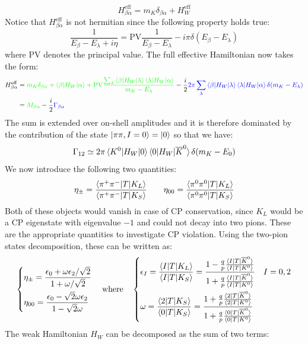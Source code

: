\documentclass[../main.tex]{subfiles}
\begin{document}
\[
H_{\beta\alpha}^{\text{eff}}=m_K\delta_{\beta\alpha}+H_W^{\text{eff}}
\]
Notice that $H_{\beta\alpha}^{\text{eff}}$ is not hermitian since the following property holds true:
\[
\frac{1}{E_\beta-E_\lambda+i\eta}=\text{PV}\frac{1}{E_\beta-E_\lambda}-i\pi\delta(E_\beta-E_\lambda)
\]
where PV denotes the principal value. The full effective Hamiltonian now takes the form:
\begin{align*}
H_{\beta\alpha}^{\text{eff}}&={\color{green}{m_K\delta_{\beta\alpha}+\braket{\beta|H_W|\alpha}+\text{PV}\frac{\sum_\lambda\braket{\beta|H_W|\lambda}\braket{\lambda|H_W|\alpha}}{m_K-E_\lambda}}}-\frac{i}{2}{\color{blue}{2\pi\sum_\lambda\braket{\beta|H_W|\lambda}\braket{\lambda|H_W|\alpha}\delta(m_K-E_\lambda)}}\\
&={\color{green}{M_{\beta\alpha}}}-\frac{i}{2}{\color{blue}{\Gamma_{\beta\alpha}}}
\end{align*}
The sum is extended over on-shell amplitudes and it is therefore dominated by the contribution of the state $\ket{\pi\pi,I=0}=\ket{0}$ so that we have:
\[
\Gamma_{12}\simeq2\pi\braket{K^0|H_W|0}\braket{0|H_W|\overline{K}^0}\delta(m_K-E_0)
\]
We now introduce the following two quantities:
\[
\eta_\pm=\frac{\braket{\pi^+\pi^-|T|K_L}}{\braket{\pi^+\pi^-|T|K_S}} \qquad \eta_{00}=\frac{\braket{\pi^0\pi^0|T|K_L}}{\braket{\pi^0\pi^0|T|K_S}}
\]
Both of these objects would vanish in case of CP conservation, since $K_L$ would be a CP eigenstate with eigenvalue $-1$ and could not decay into two pions. These are the appropriate quantities to investigate CP violation. Using the two-pion states decomposition, these can be written as:
\[
\left\{
\begin{aligned}
&\eta_\pm=\frac{\epsilon_0+\omega\epsilon_2/\sqrt{2}}{1+\omega/\sqrt{2}}\\
&\eta_{00}=\frac{\epsilon_0-\sqrt{2}\omega\epsilon_2}{1-\sqrt{2}\omega}
\end{aligned}
\right.
\quad\text{where}\quad
\left\{
\begin{aligned}
&\epsilon_I=\frac{\braket{I|T|K_L}}{\braket{I|T|K_S}}=\frac{1-\frac{q}{p}\frac{\braket{I|T|\overline{K}^0}}{\braket{I|T|K^0}}}{1+\frac{q}{p}\frac{\braket{I|T|\overline{K}^0}}{\braket{I|T|K^0}}} \quad I=0,2\\
&\omega=\frac{\braket{2|T|K_S}}{\braket{0|T|K_S}}=\frac{1+\frac{q}{p}\frac{\braket{2|T|\overline{K}^0}}{\braket{2|T|K^0}}}{1+\frac{q}{p}\frac{\braket{0|T|\overline{K}^0}}{\braket{0|T|K^0}}}
\end{aligned}
\right.
\]
The weak Hamiltonian $H_W$ can be decomposed as the sum of two terms:
\end{document}
